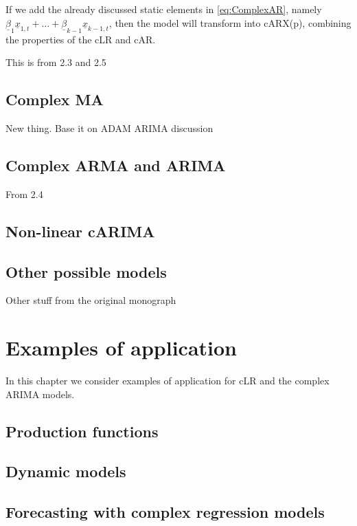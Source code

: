 \documentclass[
]{book}
\begin{document}
If we add the already discussed static elements in \eqref{eq:ComplexAR}, namely \(\underline{\beta}_1 \underline{x}_{1,t} + \dots + \underline{\beta}_{k-1} \underline{x}_{k-1,t}\), then the model will transform into cARX(p), combining the properties of the cLR and cAR.

This is from 2.3 and 2.5

\hypertarget{complex-ma}{%
\section{Complex MA}\label{complex-ma}}

New thing. Base it on ADAM ARIMA discussion

\hypertarget{complex-arma-and-arima}{%
\section{Complex ARMA and ARIMA}\label{complex-arma-and-arima}}

From 2.4

\hypertarget{non-linear-carima}{%
\section{Non-linear cARIMA}\label{non-linear-carima}}

\hypertarget{other-possible-models}{%
\section{Other possible models}\label{other-possible-models}}

Other stuff from the original monograph

\hypertarget{Examples}{%
\chapter{Examples of application}\label{Examples}}

In this chapter we consider examples of application for cLR and the complex ARIMA models.

\hypertarget{production-functions}{%
\section{Production functions}\label{production-functions}}

\hypertarget{dynamic-models}{%
\section{Dynamic models}\label{dynamic-models}}

\hypertarget{forecasting-with-complex-regression-models}{%
\section{Forecasting with complex regression models}\label{forecasting-with-complex-regression-models}}

  
\end{document}
